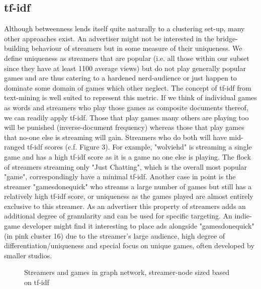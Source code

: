 \documentclass[11pt, oneside]{article}   	%
\begin{document}
\subsection{tf-idf}
Although betweenness lends itself quite naturally to a clustering set-up, many other approaches exist. An advertiser might not be interested in the bridge-building behaviour of streamers but in some measure of their uniqueness. We define uniqueness as streamers that are popular (i.e. all those within our subset since they have at least 1100 average views) but do not play generally popular games and are thus catering to a hardened nerd-audience or just happen to dominate some domain of games which other neglect. The concept of tf-idf from text-mining is well suited to represent this metric. If we think of individual games as words and streamers who play those games as composite documents thereof, we can readily apply tf-idf. Those that play games many others are playing too will be punished (inverse-document frequency) whereas those that play games that no-one else is streaming will gain. Streamers who do both will have mid-ranged tf-idf scores (c.f. Figure 3).
\newline
For example, "wolviehd" is streaming a single game and has a high tf-idf score as it is a game no one else is playing. The flock of streamers  streaming only "Just Chatting", which is the overall most popular "game", correspondingly have a minimal tf-idf.
Another case in point is the streamer "gamesdonequick" who streams a large number of games but still has a relatively high tf-idf score, or uniqueness as the games played are almost entirely exclusive to this streamer.
\newline
As an advertiser this property of streamers adds an additional degree of granularity and can be used for specific targeting. An indie-game developer might find it interesting to place ads alongside "gamesdonequick" (in pink cluster 16) due to the streamer's large audience, high degree of differentiation/uniqueness and special focus on unique games, often developed by smaller studios.

\begin{figure}
\centering
\caption{Streamers and games in graph network, streamer-node sized based on tf-idf}
\label{figure label}
\end{figure}
\end{document}
